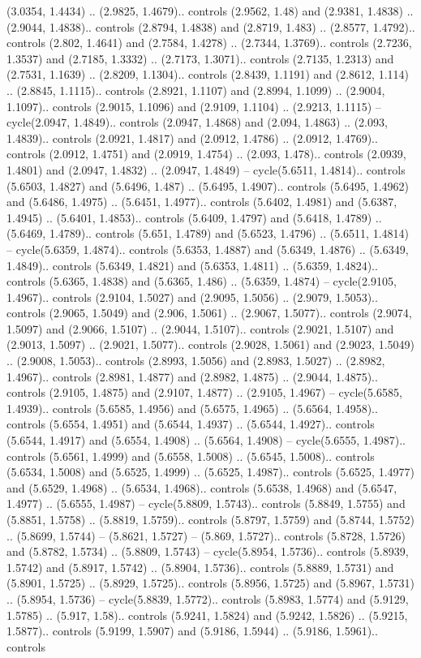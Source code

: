(3.0354, 1.4434) .. (2.9825, 1.4679).. controls (2.9562, 1.48) and (2.9381, 1.4838) .. (2.9044, 1.4838).. controls (2.8794, 1.4838) and (2.8719, 1.483) .. (2.8577, 1.4792).. controls (2.802, 1.4641) and (2.7584, 1.4278) .. (2.7344, 1.3769).. controls (2.7236, 1.3537) and (2.7185, 1.3332) .. (2.7173, 1.3071).. controls (2.7135, 1.2313) and (2.7531, 1.1639) .. (2.8209, 1.1304).. controls (2.8439, 1.1191) and (2.8612, 1.114) .. (2.8845, 1.1115).. controls (2.8921, 1.1107) and (2.8994, 1.1099) .. (2.9004, 1.1097).. controls (2.9015, 1.1096) and (2.9109, 1.1104) .. (2.9213, 1.1115) -- cycle(2.0947, 1.4849).. controls (2.0947, 1.4868) and (2.094, 1.4863) .. (2.093, 1.4839).. controls (2.0921, 1.4817) and (2.0912, 1.4786) .. (2.0912, 1.4769).. controls (2.0912, 1.4751) and (2.0919, 1.4754) .. (2.093, 1.478).. controls (2.0939, 1.4801) and (2.0947, 1.4832) .. (2.0947, 1.4849) -- cycle(5.6511, 1.4814).. controls (5.6503, 1.4827) and (5.6496, 1.487) .. (5.6495, 1.4907).. controls (5.6495, 1.4962) and (5.6486, 1.4975) .. (5.6451, 1.4977).. controls (5.6402, 1.4981) and (5.6387, 1.4945) .. (5.6401, 1.4853).. controls (5.6409, 1.4797) and (5.6418, 1.4789) .. (5.6469, 1.4789).. controls (5.651, 1.4789) and (5.6523, 1.4796) .. (5.6511, 1.4814) -- cycle(5.6359, 1.4874).. controls (5.6353, 1.4887) and (5.6349, 1.4876) .. (5.6349, 1.4849).. controls (5.6349, 1.4821) and (5.6353, 1.4811) .. (5.6359, 1.4824).. controls (5.6365, 1.4838) and (5.6365, 1.486) .. (5.6359, 1.4874) -- cycle(2.9105, 1.4967).. controls (2.9104, 1.5027) and (2.9095, 1.5056) .. (2.9079, 1.5053).. controls (2.9065, 1.5049) and (2.906, 1.5061) .. (2.9067, 1.5077).. controls (2.9074, 1.5097) and (2.9066, 1.5107) .. (2.9044, 1.5107).. controls (2.9021, 1.5107) and (2.9013, 1.5097) .. (2.9021, 1.5077).. controls (2.9028, 1.5061) and (2.9023, 1.5049) .. (2.9008, 1.5053).. controls (2.8993, 1.5056) and (2.8983, 1.5027) .. (2.8982, 1.4967).. controls (2.8981, 1.4877) and (2.8982, 1.4875) .. (2.9044, 1.4875).. controls (2.9105, 1.4875) and (2.9107, 1.4877) .. (2.9105, 1.4967) -- cycle(5.6585, 1.4939).. controls (5.6585, 1.4956) and (5.6575, 1.4965) .. (5.6564, 1.4958).. controls (5.6554, 1.4951) and (5.6544, 1.4937) .. (5.6544, 1.4927).. controls (5.6544, 1.4917) and (5.6554, 1.4908) .. (5.6564, 1.4908) -- cycle(5.6555, 1.4987).. controls (5.6561, 1.4999) and (5.6558, 1.5008) .. (5.6545, 1.5008).. controls (5.6534, 1.5008) and (5.6525, 1.4999) .. (5.6525, 1.4987).. controls (5.6525, 1.4977) and (5.6529, 1.4968) .. (5.6534, 1.4968).. controls (5.6538, 1.4968) and (5.6547, 1.4977) .. (5.6555, 1.4987) -- cycle(5.8809, 1.5743).. controls (5.8849, 1.5755) and (5.8851, 1.5758) .. (5.8819, 1.5759).. controls (5.8797, 1.5759) and (5.8744, 1.5752) .. (5.8699, 1.5744) -- (5.8621, 1.5727) -- (5.869, 1.5727).. controls (5.8728, 1.5726) and (5.8782, 1.5734) .. (5.8809, 1.5743) -- cycle(5.8954, 1.5736).. controls (5.8939, 1.5742) and (5.8917, 1.5742) .. (5.8904, 1.5736).. controls (5.8889, 1.5731) and (5.8901, 1.5725) .. (5.8929, 1.5725).. controls (5.8956, 1.5725) and (5.8967, 1.5731) .. (5.8954, 1.5736) -- cycle(5.8839, 1.5772).. controls (5.8983, 1.5774) and (5.9129, 1.5785) .. (5.917, 1.58).. controls (5.9241, 1.5824) and (5.9242, 1.5826) .. (5.9215, 1.5877).. controls (5.9199, 1.5907) and (5.9186, 1.5944) .. (5.9186, 1.5961).. controls 